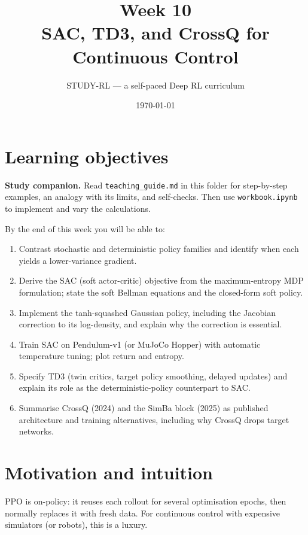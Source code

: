 \documentclass[11pt,oneside]{scrbook}
\title{{\color{rlblue}\textbf{Week 10} \\ \Huge SAC, TD3, and CrossQ for Continuous Control}}
\author{STUDY-RL --- a self-paced Deep RL curriculum}
\date{\today}
\begin{document}
\maketitle
\tableofcontents
\newpage

\chapter*{Learning objectives}


\noindent\textbf{Study companion.} Read \texttt{teaching\_guide.md} in this
folder for step-by-step examples, an analogy with its limits, and self-checks.
Then use \texttt{workbook.ipynb} to implement and vary the calculations.
\par\medskip

\begin{keyidea}
By the end of this week you will be able to:
\begin{enumerate}[leftmargin=*]
  \item Contrast stochastic and deterministic policy families and identify when each yields a lower-variance gradient.
  \item Derive the SAC (soft actor-critic) objective from the maximum-entropy MDP formulation; state the soft Bellman equations and the closed-form soft policy.
  \item Implement the tanh-squashed Gaussian policy, including the Jacobian correction to its log-density, and explain why the correction is essential.
  \item Train SAC on Pendulum-v1 (or MuJoCo Hopper) with automatic temperature tuning; plot return and entropy.
  \item Specify TD3 (twin critics, target policy smoothing, delayed updates) and explain its role as the deterministic-policy counterpart to SAC.
  \item Summarise CrossQ (2024) and the SimBa block (2025) as published architecture and training alternatives, including why CrossQ drops target networks.
\end{enumerate}
\end{keyidea}

\chapter{Motivation and intuition}

PPO is on-policy: it reuses each rollout for several optimisation epochs, then normally replaces it with fresh data. For continuous control with expensive simulators (or robots), this is a luxury. 
\end{document}

